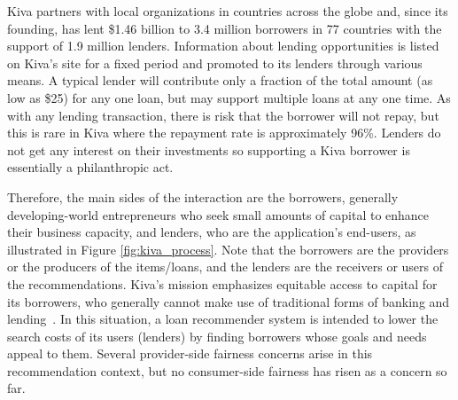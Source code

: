     
    
    Kiva partners with local organizations in countries across the globe and, since its founding, has lent \$1.46 billion to 3.4 million borrowers in 77 countries with the support of 1.9 million lenders. Information about lending opportunities is listed on Kiva's site for a fixed period and promoted to its lenders through various means. A typical lender will contribute only a fraction of the total amount (as low as \$25) for any one loan, but may support multiple loans at any one time. As with any lending transaction, there is risk that the borrower will not repay, but this is rare in Kiva where the repayment rate is approximately 96\%. Lenders do not get any interest on their investments so supporting a Kiva borrower is essentially a philanthropic act.
    
    Therefore, the main sides of the interaction are the borrowers, generally developing-world entrepreneurs who seek small amounts of capital to enhance their business capacity, and lenders, who are the application's end-users, as illustrated in Figure \ref{fig:kiva_process}. Note that the borrowers are the providers or the producers of the items/loans, and the lenders are the receivers or users of the recommendations. Kiva's mission emphasizes equitable access to capital for its borrowers, who generally cannot make use of traditional forms of banking and lending~\cite{Choo_understanding_kiva}. In this situation, a loan recommender system is intended to lower the search costs of its users (lenders) by finding borrowers whose goals and needs appeal to them. Several provider-side fairness concerns arise in this recommendation context, but no consumer-side fairness has risen as a concern so far.
    
